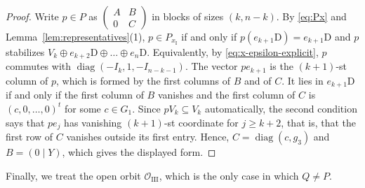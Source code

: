 \documentclass[11pt]{amsart}
\numberwithin{equation}{section}
\theoremstyle{plain}
\theoremstyle{definition}
\theoremstyle{remark}
\DeclareMathOperator{\diag}{diag}
\newcommand{\OIII}{\mathcal{O}_{\mathrm{III}}}
\begin{document}
\begin{proof}
	Write $p\in P$ as $\left(\begin{smallmatrix}A&B\\0&C\end{smallmatrix}\right)$ in blocks of sizes $(k,n-k)$. By \eqref{eq:Px} and Lemma~\ref{lem:representatives}(1), $p\in P_{x_{\mathrm I}}$ if and only if $p(e_{k+1}\mathrm{D})=e_{k+1}\mathrm{D}$ and $p$ stabilizes $V_k\oplus e_{k+2}\mathrm{D}\oplus\dots\oplus e_n\mathrm{D}$. Equivalently, by \eqref{eq:x-epsilon-explicit}, $p$ commutes with $\diag(-I_k,1,-I_{n-k-1})$. The vector $pe_{k+1}$ is the $(k+1)$-st column of $p$, which is formed by the first columns of $B$ and of $C$. It lies in $e_{k+1}\mathrm{D}$ if and only if the first column of $B$ vanishes and the first column of $C$ is $(c,0,\dots,0)^t$ for some $c\in G_1$. Since $pV_k\subseteq V_k$ automatically, the second condition says that $pe_j$ has vanishing $(k+1)$-st coordinate for $j\ge k+2$, that is, that the first row of $C$ vanishes outside its first entry. Hence, $C=\diag(c,g_3)$ and $B=(0\mid Y)$, which gives the displayed form.
\end{proof}

Finally, we treat the open orbit $\OIII$, which is the only case in which $Q\ne P$.
\end{document}
